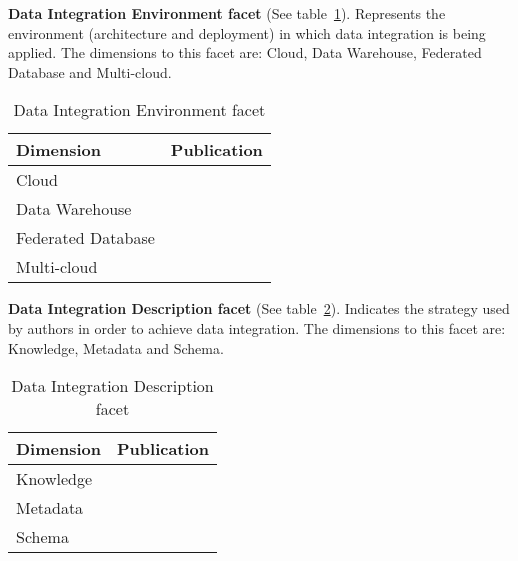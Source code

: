 \textbf{Data Integration Environment facet} (See table~\ref{table:dienviron}). 
Represents the environment (architecture and deployment) in which data integration is being applied.
The dimensions to this facet are: Cloud, Data Warehouse, Federated Database and Multi-cloud.
\begin{table}[h]
\begin{center}
\begin{tabular}{p{4cm}p{10cm}}
\hline 
\textbf{Dimension} & \textbf{Publication} \\ 
\hline 
Cloud & 
\cite{106,110,105,107,108,109,068,070,072,113,073,074,075,076,077,078,079,081,082,083,085,087,088,089,090,094,095,096,097,098,099,100,102,103}\\ 
\hline 
Data Warehouse & \cite{066,114,091} \\ 
\hline 
Federated Database & \cite{071,089,112} \\ 
\hline 
Multi-cloud & \cite{012,071,093} \\ 
\hline 
\end{tabular}
\end{center}
\caption{Data Integration Environment facet}\label{table:dienviron}
\end{table}

\textbf{Data Integration Description facet} (See table~\ref{table:didesc}).
Indicates the strategy used by authors in order to achieve data integration. 
The dimensions to this facet are: Knowledge, Metadata and Schema.
\begin{table}[h]
\begin{center}
\begin{tabular}{p{4cm}p{10cm}}
\hline 
\textbf{Dimension} & \textbf{Publication} \\ 
\hline 
Knowledge & \cite{012,083} \\ 
\hline 
Metadata & \cite{108,066,113} \\ 
\hline 
Schema & \cite{070,071,072,073,075,114,083,089,091,112,102} \\ 
\hline 
\end{tabular}
\end{center}
\caption{Data Integration Description facet}\label{table:didesc}
\end{table}

